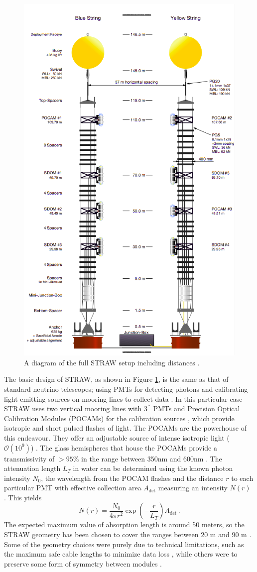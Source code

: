 \begin{figure}[H]
  \centering
  \includegraphics[width=.7\textwidth]{./Figures/STRAW.png}
  \caption{A diagram of the full STRAW setup including distances \cite{straw}.}
  \label{fig:straw}
\end{figure}

The basic design of STRAW, as shown in Figure \ref{fig:straw}, is the same as that of standard neutrino telescopes; using PMTs for detecting photons and calibrating light emitting sources on mooring lines to collect data \cite{straw}. In this particular case STRAW uses two vertical mooring lines with $3^{\prime\prime}$ PMTs and Precision Optical Calibration Modules (POCAMs) for the calibration sources \cite{straw}, which provide isotropic and short pulsed flashes of light. The POCAMs are the powerhouse of this endeavour. They offer an adjustable source of intense isotropic light ($\mathcal{O}(10^{9})$) \cite{pocam}. The glass hemispheres that house the POCAMs provide a transmissivity of $>95\%$ in the range between 350nm and 600nm \cite{pocam}. The attenuation length $L_{T}$ in water can be determined using the known photon intensity $N_{0}$, the wavelength from the POCAM flashes and the distance $r$ to each particular PMT with effective collection area $A_{\text{det}}$ measuring an intensity $N(r)$ \cite{straw}. This yields
\begin{equation}
  N(r) = \frac{N_{0}}{4\pi r^{2}}\exp\left(-\frac{r}{L_{T}}\right)A_{\text{det}}\, .
\end{equation}
The expected maximum value of absorption length is around 50 meters, so the STRAW geometry has been chosen to cover the ranges between 20 m and 90 m \cite{straw}. Some of the geometry choices were purely due to technical limitations, such as the maximum safe cable lengths to minimize data loss \cite{straw}, while others were to preserve some form of symmetry between modules \cite{straw}.

